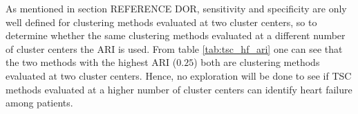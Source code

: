 As mentioned in section REFERENCE DOR, sensitivity and specificity are only well defined for clustering methods evaluated at two cluster centers,
so to determine whether the same clustering methods evaluated at a different number of cluster centers the ARI is used.
From table \ref{tab:tsc_hf_ari} one can see that the two methods with the highest ARI ($0.25$) both are clustering methods evaluated at two cluster centers. 
Hence, no exploration will be done to see if TSC methods evaluated at a higher number of cluster centers can identify heart failure among patients.

\newpage

